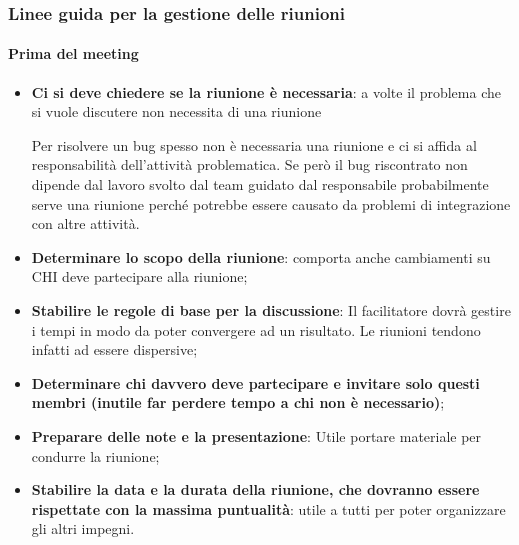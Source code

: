 \subsubsection{Linee guida per la gestione delle riunioni}
\paragraph{Prima del meeting}
\begin{itemize}
	\item \textbf{Ci si deve chiedere se la riunione è necessaria}: a volte il problema che si vuole discutere non necessita di una riunione
	\begin{info}[Esempio]
		Per risolvere un bug spesso non è necessaria una riunione e ci si affida al responsabilità dell'attività problematica. Se però il bug riscontrato non dipende dal lavoro svolto dal team guidato dal responsabile probabilmente serve una riunione perché potrebbe essere causato da problemi di integrazione con altre attività.
	\end{info}
	\item \textbf{Determinare lo scopo della riunione}: comporta anche cambiamenti su CHI deve partecipare alla riunione;
	\item \textbf{Stabilire le regole di base per la discussione}: Il facilitatore dovrà gestire i tempi in modo da poter convergere ad un risultato. Le riunioni tendono infatti ad essere dispersive;
	\item \textbf{Determinare chi davvero deve partecipare e invitare solo questi membri (inutile far perdere tempo a chi non è necessario)};
	\item \textbf{Preparare delle note e la presentazione}: Utile portare materiale per condurre la riunione;
	\item \textbf{Stabilire la data e la durata della riunione, che dovranno essere rispettate con la massima puntualità}: utile a tutti per poter organizzare gli altri impegni.
\end{itemize}


